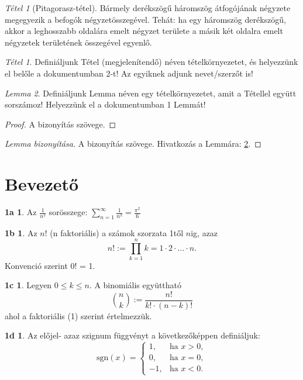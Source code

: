 \documentclass{article}
\theoremstyle{remark}
\begin{document}
\newtheorem{tétel}{Tétel}
\newtheorem{Tétel2}{Tétel}[section]
\begin{tétel}[Pitagorasz-tétel]
    Bármely derékszögű háromszög átfogójának négyzete megegyezik a befogók négyzetösszegével. Tehát: ha egy háromszög derékszögű, akkor a leghosszabb oldalára emelt négyzet területe a másik két oldalra emelt négyzetek területének összegével egyenlő.
\end{tétel}
\begin{Tétel2}
    Definiáljunk Tétel (megjelenítendő) néven tételkörnyezetet, és helyezzünk el belőle a dokumentumban 2-t! Az egyiknek adjunk nevet/szerzőt is!
\end{Tétel2}
\leavevmode
\newtheorem{lemma}[tétel]{Lemma}
\begin{lemma}\label{lemmabiz}
    Definiáljunk Lemma néven egy tételkörnyezetet, amit a Tétellel együtt sorszámoz! Helyezzünk el a dokumentumban 1 Lemmát!
\end{lemma}
\theoremstyle{definition}
\newtheorem{definíció}{Definíció}[section]
\begin{proof}
    A bizonyítás szövege.
\end{proof}
\begin{proof}[Lemma bizonyítása]
    A bizonyítás szövege. Hivatkozás a Lemmára: \ref{lemmabiz}.
\end{proof}    
\section{Bevezető}
\newtheorem{1a}{1a}
\begin{1a}
Az \( \frac{1}{{n^2}} \) sorösszege: 
\( \sum_{n=1}^{\infty} \frac{1}{{n^2}} = \frac{{\pi^2}}{6} \)
\end{1a}
\newtheorem{1b}{1b}
\begin{1b}
Az \(n!\) (n faktoriális) a számok szorzata 1től \(n\)ig, azaz
\[n! := \prod_{k=1}^{n} k = 1 \cdot 2 \cdot \ldots \cdot n.\]
Konvenció szerint 0! = 1.
\end{1b}
\newtheorem{1c}{1c}
\begin{1c}
Legyen \(0 \leq k \leq n\). A binomiális együttható
\[
\binom{n}{k} := \frac{n!}{k! \cdot (n - k)!}
\]
ahol a faktoriális (1) szerint értelmezzük.
\end{1c}
\newtheorem{1d}{1d}
\begin{1d}
Az előjel- azaz szignum függvényt a következőképpen definiáljuk:
\[
\text{sgn}(x) = 
\begin{cases} 
1, & \text{ha } x > 0, \\
0, & \text{ha } x = 0, \\
-1, & \text{ha } x < 0.
\end{cases}
\]
\end{1d}
\end{document}
